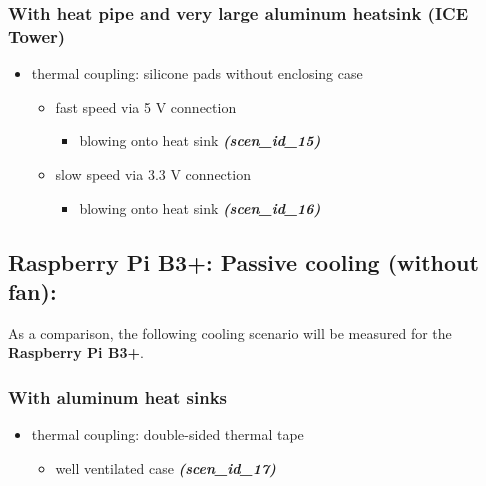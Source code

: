 \documentclass[10pt,parskip=half,
toc=sectionentrywithdots,
bibliography=totocnumbered,
captions=tableheading,numbers=noendperiod]{scrartcl}
\providecommand{\tightlist}{%
  \setlength{\itemsep}{0pt}\setlength{\parskip}{0pt}}
\begin{document}
\hypertarget{with-heat-pipe-and-very-large-aluminum-heatsink-ice-tower}{%
\subsubsection{With heat pipe and very large aluminum heatsink (ICE
Tower)}\label{with-heat-pipe-and-very-large-aluminum-heatsink-ice-tower}}

\begin{itemize}
\tightlist
\item
  thermal coupling: silicone pads without enclosing case

  \begin{itemize}
  \tightlist
  \item
    fast speed via 5 V connection

    \begin{itemize}
    \tightlist
    \item
      blowing onto heat sink \textbf{\emph{(scen\_id\_15)}}
    \end{itemize}
  \item
    slow speed via 3.3 V connection

    \begin{itemize}
    \tightlist
    \item
      blowing onto heat sink \textbf{\emph{(scen\_id\_16)}}
    \end{itemize}
  \end{itemize}
\end{itemize}

\hypertarget{raspberry-pi-b3-passive-cooling-without-fan}{%
\subsection{Raspberry Pi B3+: Passive cooling (without
fan):}\label{raspberry-pi-b3-passive-cooling-without-fan}}

As a comparison, the following cooling scenario will be measured for the
\textbf{Raspberry Pi B3+}.

\hypertarget{with-aluminum-heat-sinks}{%
\subsubsection{With aluminum heat
sinks}\label{with-aluminum-heat-sinks}}

\begin{itemize}
\tightlist
\item
  thermal coupling: double-sided thermal tape

  \begin{itemize}
  \tightlist
  \item
    well ventilated case \textbf{\emph{(scen\_id\_17)}}
  \end{itemize}
\end{itemize}
\end{document}
